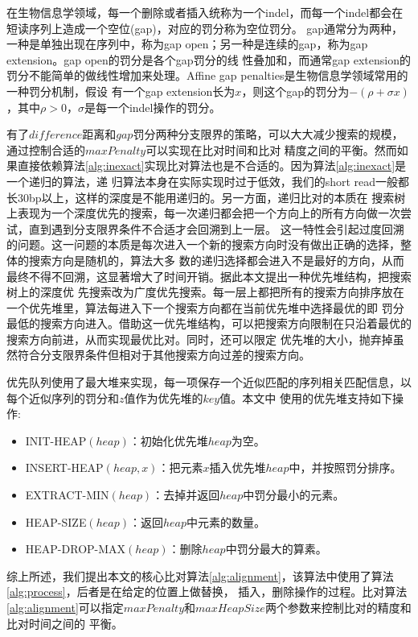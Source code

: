 \documentclass[UTF8,adobefonts]{ctexart}
\begin{document}
在生物信息学领域，每一个删除或者插入统称为一个indel，而每一个indel都会在短读序列上造成一个空位(gap)，对应的罚分称为空位罚分。
gap通常分为两种，一种是单独出现在序列中，称为gap open；另一种是连续的gap，称为gap extension。gap open的罚分是各个gap罚分的线
性叠加和，而通常gap extension的罚分不能简单的做线性增加来处理。Affine gap penalties\cite{eddy1998profile}是生物信息学领域常用的一种罚分机制，假设
有一个gap extension长为$x$，则这个gap的罚分为$-(\rho +\sigma x)$，其中$\rho >0$，$\sigma$是每一个indel操作的罚分。

有了$difference$距离和$gap$罚分两种分支限界的策略，可以大大减少搜索的规模，通过控制合适的$maxPenalty$可以实现在比对时间和比对
精度之间的平衡。然而如果直接依赖算法\ref{alg:inexact}实现比对算法也是不合适的。因为算法\ref{alg:inexact}是一个递归的算法，递
归算法本身在实际实现时过于低效，我们的short read一般都长30bp以上，这样的深度是不能用递归的。另一方面，递归比对的本质在
搜索树上表现为一个深度优先的搜索，每一次递归都会把一个方向上的所有方向做一次尝试，直到遇到分支限界条件不合适才会回溯到上一层。
这一特性会引起过度回溯的问题。这一问题的本质是每次进入一个新的搜索方向时没有做出正确的选择，整体的搜索方向是随机的，算法大多
数的递归选择都会进入不是最好的方向，从而最终不得不回溯，这显著增大了时间开销。据此本文提出一种优先堆结构，把搜索树上的深度优
先搜索改为广度优先搜索。每一层上都把所有的搜索方向排序放在一个优先堆里，算法每进入下一个搜索方向都在当前优先堆中选择最优的即
罚分最低的搜索方向进入。借助这一优先堆结构，可以把搜索方向限制在只沿着最优的搜索方向前进，从而实现最优比对。同时，还可以限定
优先堆的大小，抛弃掉虽然符合分支限界条件但相对于其他搜索方向过差的搜索方向。

优先队列使用了最大堆来实现，每一项保存一个近似匹配的序列相关匹配信息，以每个近似序列的罚分和$z$值作为优先堆的$key$值。本文中
使用的优先堆支持如下操作:

\begin{itemize}
    \item INIT-HEAP$(heap)$：初始化优先堆$heap$为空。
    \item INSERT-HEAP$(heap,x)$：把元素$x$插入优先堆$heap$中，并按照罚分排序。
    \item EXTRACT-MIN$(heap)$：去掉并返回$heap$中罚分最小的元素。
    \item HEAP-SIZE$(heap)$：返回$heap$中元素的数量。
    \item HEAP-DROP-MAX$(heap)$：删除$heap$中罚分最大的算素。
\end{itemize}

综上所述，我们提出本文的核心比对算法\ref{alg:alignment}，该算法中使用了算法\ref{alg:process}，后者是在给定的位置上做替换，
插入，删除操作的过程。比对算法\ref{alg:alignment}可以指定$maxPenalty$和$maxHeapSize$两个参数来控制比对的精度和比对时间之间的
平衡。
\end{document}
